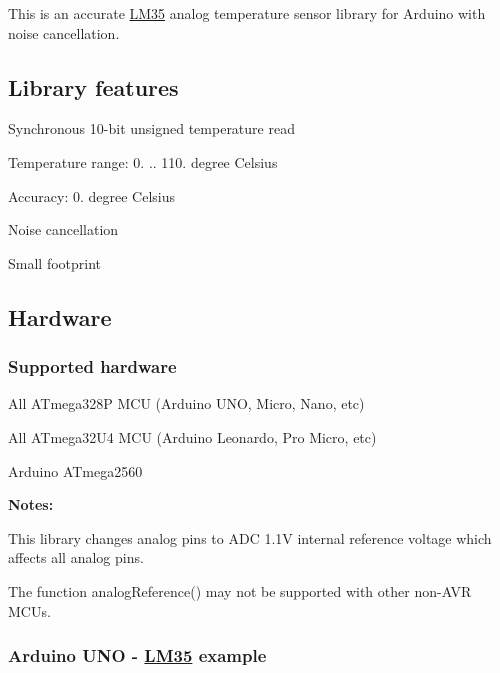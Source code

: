 \href{https://travis-ci.org/Erriez/ErriezLM35}{\tt }

This is an accurate \hyperlink{class_l_m35}{L\+M35} analog temperature sensor library for Arduino with noise cancellation.

\subsection*{Library features}


\begin{DoxyItemize}
\item Synchronous 10-\/bit unsigned temperature read
\item Temperature range\+: 0. .. 110. degree Celsius
\item Accuracy\+: 0. degree Celsius
\item Noise cancellation
\item Small footprint
\end{DoxyItemize}

\subsection*{Hardware}

\subsubsection*{Supported hardware}


\begin{DoxyItemize}
\item All A\+Tmega328P M\+CU (Arduino U\+NO, Micro, Nano, etc)
\item All A\+Tmega32\+U4 M\+CU (Arduino Leonardo, Pro Micro, etc)
\item Arduino A\+Tmega2560
\end{DoxyItemize}

{\bfseries Notes\+:}


\begin{DoxyItemize}
\item This library changes analog pins to A\+DC 1.\+1V internal reference voltage which affects all analog pins.
\item The function {\ttfamily analog\+Reference()} may not be supported with other non-\/\+A\+VR M\+CU\textquotesingle{}s.
\end{DoxyItemize}

\subsubsection*{Arduino U\+NO -\/ \hyperlink{class_l_m35}{L\+M35} example}



